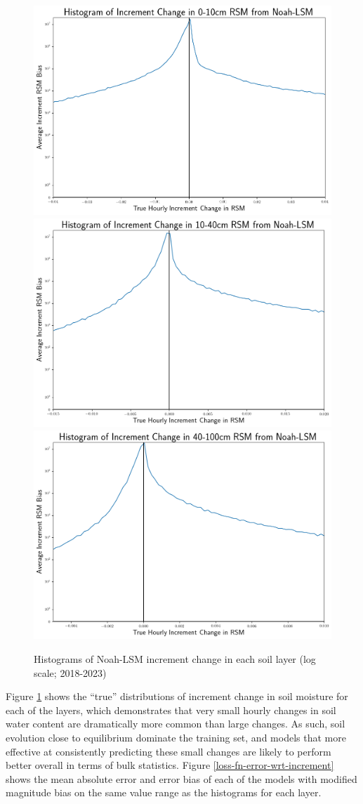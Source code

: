 \begin{figure}[H]
    \centering
    \includegraphics[width=.32\linewidth,draft=false]{figures/error-wrt-increment-change/eval_test_rsm-10_increment-error-1d_hist-log.png}
    \includegraphics[width=.32\linewidth,draft=false]{figures/error-wrt-increment-change/eval_test_rsm-40_increment-error-1d_hist-log.png}
    \includegraphics[width=.32\linewidth,draft=false]{figures/error-wrt-increment-change/eval_test_rsm-100_increment-error-1d_hist-log.png}

    \caption{Histograms of Noah-LSM increment change in each soil layer (log scale; 2018-2023)}
    \label{hists-increment}
\end{figure}

Figure \ref{hists-increment} shows the ``true'' distributions of increment change in soil moisture for each of the layers, which demonstrates that very small hourly changes in soil water content are dramatically more common than large changes. As such, soil evolution close to equilibrium dominate the training set, and models that more effective at consistently predicting these small changes are likely to perform better overall in terms of bulk statistics. Figure \ref{loss-fn-error-wrt-increment} shows the mean absolute error and error bias of each of the models with modified magnitude bias on the same value range as the histograms for each layer.

